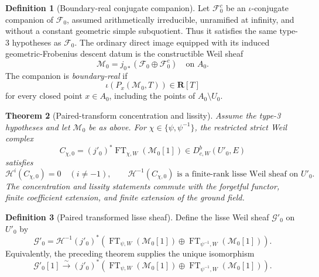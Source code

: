 \documentclass[10pt]{article}
\newtheorem{theorem}{Theorem}[section]
\theoremstyle{definition}
\newtheorem{definition}[theorem]{Definition}
\newcommand{\DbcW}{D^b_{c,W}}
\newcommand{\FT}{\operatorname{FT}}
\begin{document}
\begin{definition}[Boundary-real conjugate companion]
Let \(\mathcal F_0^c\) be an \(\iota\)-conjugate companion of
\(\mathcal F_0\), assumed arithmetically irreducible, unramified at
infinity, and without a constant geometric simple subquotient.  Thus it
satisfies the same type-3 hypotheses as \(\mathcal F_0\).  The ordinary
direct image equipped with its induced geometric-Frobenius descent datum is
the constructible Weil sheaf
\[
       \mathcal M_0=j_{0*}(\mathcal F_0\oplus\mathcal F_0^c)
       \quad\text{on }A_0.
\]
The companion is \emph{boundary-real} if
\[
                 \iota(P_x(\mathcal M_0,T))\in\mathbf R[T]
\]
for every closed point \(x\in A_0\), including the points of
\(A_0\setminus U_0\).
\end{definition}

\begin{theorem}[Paired-transform concentration and lissity]
Assume the type-3 hypotheses and let \(\mathcal M_0\) be as above.  For
\(\chi\in\{\psi,\psi^{-1}\}\), the restricted strict Weil complex
\[
 C_{\chi,0}=(j'_0)^*\FT_{\chi,W}(\mathcal M_0[1])
       \in\DbcW(U'_0,E)
\]
satisfies
\[
 \mathcal H^i(C_{\chi,0})=0\quad(i\ne-1),
 \qquad
 \mathcal H^{-1}(C_{\chi,0})
 \text{ is a finite-rank lisse Weil sheaf on }U'_0.
\]
The concentration and lissity statements commute with the forgetful
functor, finite coefficient extension, and finite extension of the ground
field.
\end{theorem}

\begin{definition}[Paired transformed lisse sheaf]
Define the lisse Weil sheaf \(\mathcal G'_0\) on \(U'_0\) by
\[
 \mathcal G'_0=\mathcal H^{-1}(j'_0)^*\!\left(
  \FT_{\psi,W}(\mathcal M_0[1])\oplus
  \FT_{\psi^{-1},W}(\mathcal M_0[1])
 \right).
\]
Equivalently, the preceding theorem supplies the unique isomorphism
\[
 \mathcal G'_0[1]\xrightarrow{\sim}
 (j'_0)^*\!\left(
  \FT_{\psi,W}(\mathcal M_0[1])\oplus
  \FT_{\psi^{-1},W}(\mathcal M_0[1])
 \right).
\]
\end{definition}
\end{document}
